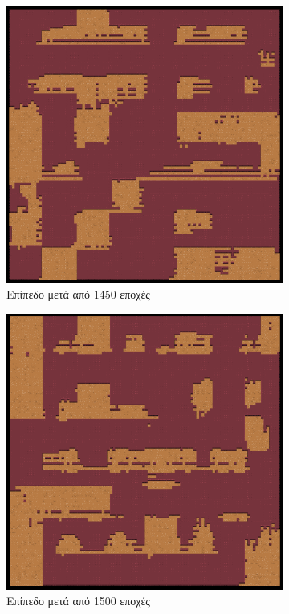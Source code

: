 \begin{figure}[H]
\begin{subfigure}{.5\textwidth}
  \centering
  \includegraphics[width=.8\linewidth]{../images/generated/1450.png}
  \caption{Επίπεδο μετά από 1450 εποχές}
  \label{fig:sfig1}
\end{subfigure}%
\begin{subfigure}{.5\textwidth}
  \centering
  \includegraphics[width=.8\linewidth]{../images/generated/1500.png}
  \caption{Επίπεδο μετά από 1500 εποχές}
  \label{fig:sfig2}
\end{subfigure}
\begin{subfigure}{.5\textwidth}

\end{subfigure}
\end{figure}
